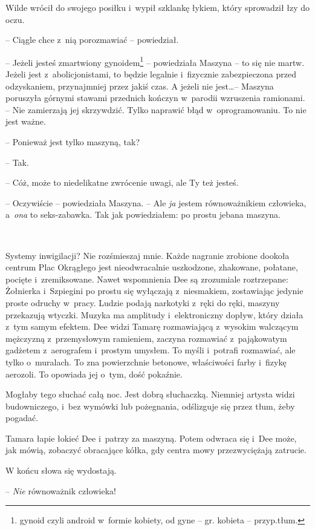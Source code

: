 \documentclass[oneside,polish,11pt,sfheadings]{mwbk}
\begin{document}
Wilde wrócił do swojego posiłku i~wypił szklankę łykiem, który
sprowadził łzy do oczu.

-- Ciągle chce z~nią porozmawiać -- powiedział.

-- Jeżeli jesteś zmartwiony gynoidem\footnote{gynoid czyli android w~formie kobiety, od gyne -- gr. kobieta  -- przyp.tłum.} -- powiedziała
Maszyna -- to się nie martw. Jeżeli jest z~abolicjonistami, to będzie
legalnie i~fizycznie zabezpieczona przed odzyskaniem, przynajmniej przez
jakiś czas. A jeżeli nie jest\ldots -- Maszyna poruszyła górnymi stawami
przednich kończyn w~parodii wzruszenia ramionami. -- Nie zamierzają jej
skrzywdzić. Tylko naprawić błąd w~oprogramowaniu. To nie jest ważne.

-- Ponieważ jest tylko maszyną, tak?

-- Tak.

-- Cóż, może to niedelikatne zwrócenie uwagi, ale Ty też jesteś.

-- Oczywiście -- powiedziała Maszyna. -- Ale \emph{ja} jestem
równoważnikiem człowieka, a~\emph{ona} to seks-zabawka. Tak jak
powiedziałem: po prostu jebana maszyna.

~

Systemy inwigilacji? Nie rozśmieszaj mnie. Każde nagranie zrobione
dookoła centrum Plac Okrągłego jest nieodwracalnie uszkodzone,
zhakowane, połatane, pocięte i~zremiksowane. Nawet wspomnienia Dee są
zrozumiale roztrzepane: Żołnierka i~Szpiegini po prostu się wyłączają z~niesmakiem, zostawiając jedynie proste odruchy w~pracy. Ludzie podają
narkotyki z~ręki do ręki, maszyny przekazują wtyczki. Muzyka ma
amplitudy i~elektroniczny dopływ, który działa z~tym samym efektem. Dee
widzi Tamarę rozmawiającą z~wysokim walczącym mężczyzną z~przemysłowym
ramieniem, zaczyna rozmawiać z~pająkowatym gadżetem z~aerografem i~prostym umysłem. To myśli i~potrafi rozmawiać, ale tylko o~muralach. To
zna powierzchnie betonowe, właściwości farby i~fizykę aerozoli. To
opowiada jej o~tym, dość pokaźnie.

Mogłaby tego słuchać całą noc. Jest dobrą słuchaczką. Niemniej artysta
widzi budowniczego, i~bez wymówki lub pożegnania, odślizguje się przez
tłum, żeby pogadać.

Tamara łapie łokieć Dee i~patrzy za maszyną. Potem odwraca się i~Dee
może, jak mówią, zobaczyć obracające kółka, gdy centra mowy
przezwyciężają zatrucie.

W końcu słowa się wydostają.

-- \emph{Nie} równoważnik człowieka!
\end{document}
